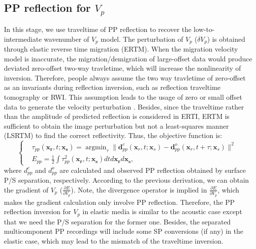 \subsection{PP reflection for $V_p$}
In this stage, we use traveltime of PP reflection to recover the low-to-intermediate wavenumber of $V_p$ model. 
The perturbation of $V_p$ ($\delta V_p$) is obtained through elastic reverse time migration (ERTM). 
When the migration velocity model is inaccurate, the migration/demigration of large-offset data would produce deviated
zero-offset two-way travletime, which will increase the nonlinearity of inversion.
Therefore, 
people always assume
the two way travletime of zero-offset as an invariants during reflection inversion, such as reflection traveltime tomography or RWI.
This assumption leads to the usage of zero or small offset data to generate the velocity
perturbation \cite[]{Zhou2015}. 
Besides, since the traveltime rather than the amplitude of predicted reflection is considered in ERTI, 
ERTM is sufficient to obtain the image perturbation but not a least-squares manner (LSRTM) to find the correct reflectivity. 
Thus, the objective function is:
\begin{equation}
	\left\{
		\begin{aligned}
			&\tau_{pp}(\mathbf{x_r},t;\mathbf{x_s})=\mathop{\arg\min}_{\tau}
			\parallel\mathbf{d}^{c}_{pp}(\mathbf{x}_r,t;\mathbf{x}_s)-\mathbf{d}^{o}_{pp}(\mathbf{x}_r,t+\tau;\mathbf{x}_s)\parallel^2\\
			&E_{pp}=\frac{1}{2}\int\tau^2_{pp}(\mathbf{x_r},t;\mathbf{x_s})dtd\mathbf{x_r}d\mathbf{x_s},
		\end{aligned}
	\right.
    \label{eq:ObjectivefunctionPP} 
\end{equation}
where $d^{c}_{pp}$ and $d^{o}_{pp}$ are calculated and observed PP reflection obtained by surface P/S
separation, respectively. According to the previous derivation, we can obtain the gradient of  $V_p$ ($\frac{\partial E}{\partial
V_p}$).
Note, 
the divergence operator is implied in $\frac{\partial
E}{\partial V_p}$, which makes the gradient calculation only involve PP reflection.
Therefore, the PP reflection inversion for $V_p$ in elastic media is similar to the acoustic case
except that we need the P/S separation for the former one. Besides, the separated multicomponent PP
recordings will include some SP conversions (if any) in the elastic case, which may lead to the mismatch of
the traveltime inversion.
